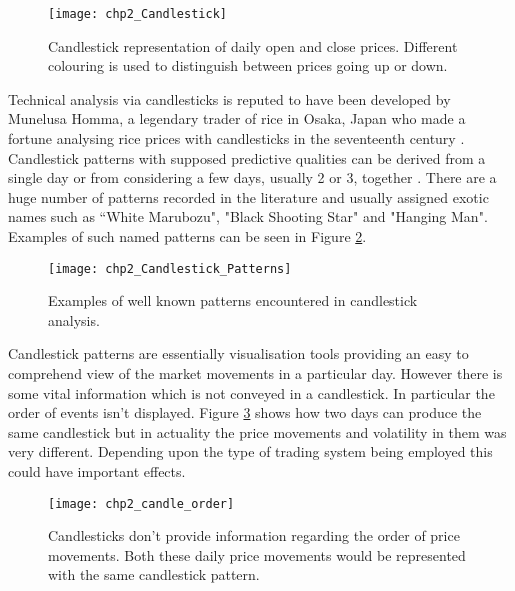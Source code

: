 \begin{figure}[tbph!]
\centering
\texttt{[image: chp2\_Candlestick]}
\caption[Candlestick representation of daily open and close prices]{Candlestick representation of daily open and close prices. Different colouring is used to distinguish between prices going up or down.}
\label{fig:Candlestick}
\end{figure}

Technical analysis via candlesticks is reputed to have been developed by Munelusa Homma, a legendary trader of rice in Osaka, Japan who made a fortune analysing rice prices with candlesticks in the seventeenth century \citep{nison2001japanese}. Candlestick patterns with supposed predictive qualities can be derived from a single day or from considering a few days, usually 2 or 3, together \citep{bigalow2011profitable}. There are a huge number of patterns recorded in the literature and usually assigned exotic names such as \textquotedblleft White Marubozu", "Black Shooting Star" and "Hanging Man". Examples of such named patterns can be seen in Figure \ref{fig:Candlestick_Patterns}.

\begin{figure}[tbph!]
\centering
\texttt{[image: chp2\_Candlestick\_Patterns]}
\caption[Examples of well known candlestick patterns]{Examples of well known patterns encountered in candlestick analysis.}
\label{fig:Candlestick_Patterns}
\end{figure}

Candlestick patterns are essentially visualisation tools providing an easy to comprehend view of the market movements in a particular day. However there is some vital information which is not conveyed in a candlestick. In particular the order of events isn't displayed. Figure \ref{fig:chp2_candle_order} shows how two days can produce the same candlestick but in actuality the price movements and volatility in them was very different. Depending upon the type of trading system being employed this could have important effects.

\begin{figure}[tbph!]
\centering
\texttt{[image: chp2\_candle\_order]}
\caption[Candlesticks and market movement]{Candlesticks don't provide information regarding the order of price movements. Both these daily price movements would be represented with the same candlestick pattern.}
\label{fig:chp2_candle_order}
\end{figure}


